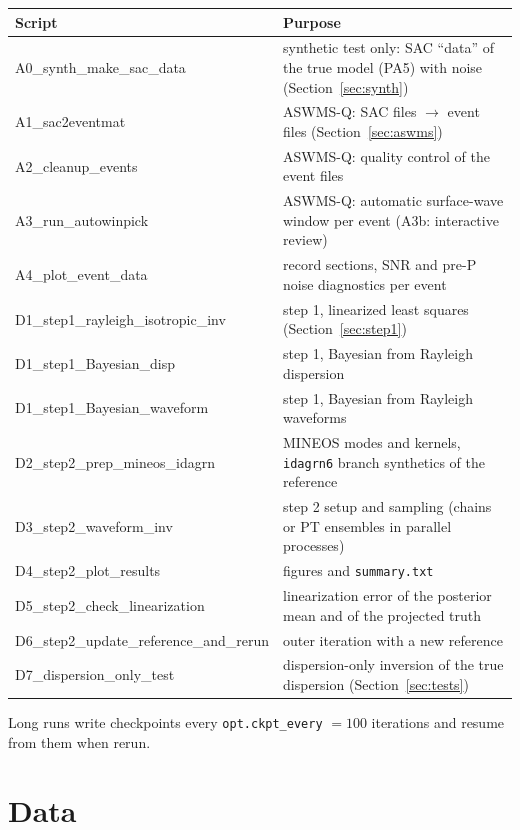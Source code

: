 \documentclass[11pt]{article}
\begin{document}
{\small
\begin{longtable}{>{\ttfamily\raggedright}p{}p{}}
\toprule
\normalfont Script & Purpose \\
\midrule
\endhead
A0\_synth\_make\_sac\_data & synthetic test only: SAC ``data'' of the true model (PA5) with noise (Section~\ref{sec:synth})\\
A1\_sac2eventmat & ASWMS-Q: SAC files $\to$ event files (Section~\ref{sec:aswms})\\
A2\_cleanup\_events & ASWMS-Q: quality control of the event files\\
A3\_run\_autowinpick & ASWMS-Q: automatic surface-wave window per event (A3b: interactive review)\\
A4\_plot\_event\_data & record sections, SNR and pre-P noise diagnostics per event\\
D1\_step1\_rayleigh\_isotropic\_inv & step 1, linearized least squares (Section~\ref{sec:step1})\\
D1\_step1\_Bayesian\_disp & step 1, Bayesian from Rayleigh dispersion\\
D1\_step1\_Bayesian\_waveform & step 1, Bayesian from Rayleigh waveforms\\
D2\_step2\_prep\_mineos\_idagrn & MINEOS modes and kernels, \texttt{idagrn6} branch synthetics of the reference\\
D3\_step2\_waveform\_inv & step 2 setup and sampling (chains or PT ensembles in parallel processes)\\
D4\_step2\_plot\_results & figures and \texttt{summary.txt}\\
D5\_step2\_check\_linearization & linearization error of the posterior mean and of the projected truth\\
D6\_step2\_update\_reference\_and\_rerun & outer iteration with a new reference\\
D7\_dispersion\_only\_test & dispersion-only inversion of the true dispersion (Section~\ref{sec:tests})\\
\bottomrule
\end{longtable}}
Long runs write checkpoints every \texttt{opt.ckpt\_every} $=100$ iterations
and resume from them when rerun.

\section{Data}\label{sec:data}
\end{document}
